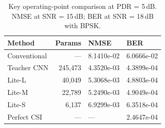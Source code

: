 \begin{table}[t]
\centering
\caption{Key operating-point comparison at PDR = 5\,dB. NMSE at SNR = 15\,dB; BER at SNR = 18\,dB with BPSK.}
\label{tab:operating_points}
\begin{tabular}{lrll}
\toprule
Method & Params & NMSE & BER \\
\midrule
Conventional & --- & 8.1410e-02 & 6.0666e-02 \\
Teacher CNN & 245,473 & 4.3520e-03 & 4.3899e-04 \\
Lite-L & 40,049 & 5.3068e-03 & 4.8803e-04 \\
Lite-M & 22,789 & 5.2490e-03 & 4.9049e-04 \\
Lite-S & 6,137 & 6.9299e-03 & 6.3518e-04 \\
Perfect CSI & --- & --- & 2.4647e-04 \\
\bottomrule
\end{tabular}
\end{table}
